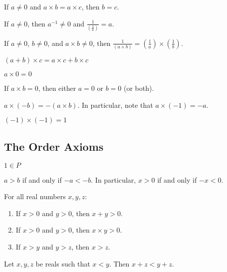 \documentclass[11pt]{article}
\begin{document}
\begin{proposition}\label{1.2.7}
    If \( a \neq 0 \) and \( a \times b = a \times c \), then \( b = c \).
\end{proposition}

\begin{proposition}\label{1.2.8}
    If \( a \neq 0 \), then \( a^{-1} \neq 0 \) and \( \frac{1}{\left(\frac{1}{a}\right)} = a \).
\end{proposition}

\begin{proposition}\label{1.2.9}
    If \( a \neq 0 \), \( b \neq 0 \), and \( a \times b \neq 0 \), then \( \frac{1}{(a \times b)} = \left(\frac{1}{a}\right) \times \left(\frac{1}{b}\right) \).
\end{proposition}

\begin{proposition}\label{1.2.10}
    \( (a + b) \times c = a \times c + b \times c \)
\end{proposition}
\begin{proposition}\label{1.2.11}
    \( a \times 0 = 0 \)
\end{proposition}
\begin{proposition}\label{1.2.12}
    If \( a \times b = 0 \), then either \( a = 0 \) or \( b = 0 \) (or both).
\end{proposition}
\begin{proposition}\label{1.2.13}
    \( a \times (-b) = -(a \times b) \). In particular, note that \( a \times (-1) = -a \).
\end{proposition}

\begin{proposition}\label{1.2.14}
    \( (-1) \times (-1) = 1 \)
\end{proposition}
\subsection{The Order Axioms}
\begin{proposition}\label{1.3.1}
    \( 1 \in P \)
\end{proposition}
\begin{proposition}\label{1.3.2}
    \( a > b \) if and only if \( -a < -b \). In particular, \( x > 0 \) if and only if \( -x < 0 \).
\end{proposition}

\begin{proposition}\label{1.3.3}
    For all real numbers \( x, y, z \):
    \begin{enumerate}
        \item If \( x > 0 \) and \( y > 0 \), then \( x + y > 0 \).
        \item If \( x > 0 \) and \( y > 0 \), then \( x \times y > 0 \).
        \item If \( x > y \) and \( y > z \), then \( x > z \).
    \end{enumerate}
\end{proposition}
\begin{proposition}\label{1.3.4}
    Let \( x, y, z \) be reals such that \( x < y \). Then \( x + z < y + z \).
\end{proposition}
\end{document}
